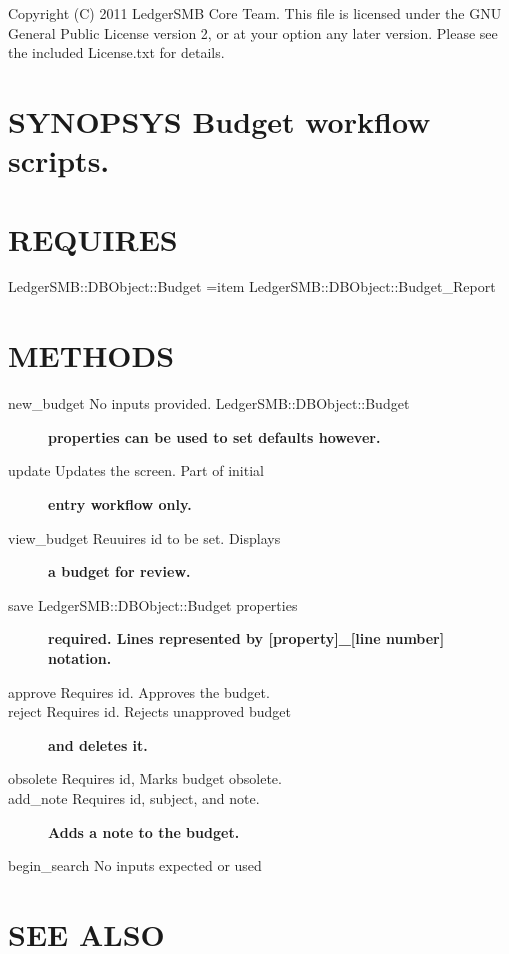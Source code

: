 \begin{description}
Copyright (C) 2011 LedgerSMB Core Team.  This file is licensed under the GNU 
General Public License version 2, or at your option any later version.  Please
see the included License.txt for details.

\section{SYNOPSYS
Budget workflow scripts.\label{SYNOPSYS_Budget_workflow_scripts_}}
\section{REQUIRES\label{REQUIRES}}
\begin{description}

\item[{LedgerSMB::DBObject::Budget =item LedgerSMB::DBObject::Budget\_Report}] \mbox{}\end{description}
\section{METHODS\label{METHODS}}
\begin{description}

\item[{new\_budget No inputs provided. LedgerSMB::DBObject::Budget}] \textbf{properties can be used to set defaults however.}
\item[{update Updates the screen. Part of initial}] \textbf{entry workflow only.}
\item[{view\_budget Reuuires id to be set. Displays}] \textbf{a budget for review.}
\item[{save LedgerSMB::DBObject::Budget properties}] \textbf{required. Lines represented by [property]\_[line number] notation.}
\item[{approve Requires id. Approves the budget.}] \mbox{}
\item[{reject Requires id. Rejects unapproved budget}] \textbf{and deletes it.}
\item[{obsolete Requires id, Marks budget obsolete.}] \mbox{}
\item[{add\_note Requires id, subject, and note.}] \textbf{Adds a note to the budget.}
\item[{begin\_search No inputs expected or used}] \mbox{}\end{description}
\section{SEE ALSO\label{SEE_ALSO}}
\begin{description}


\end{description}
\end{description}
